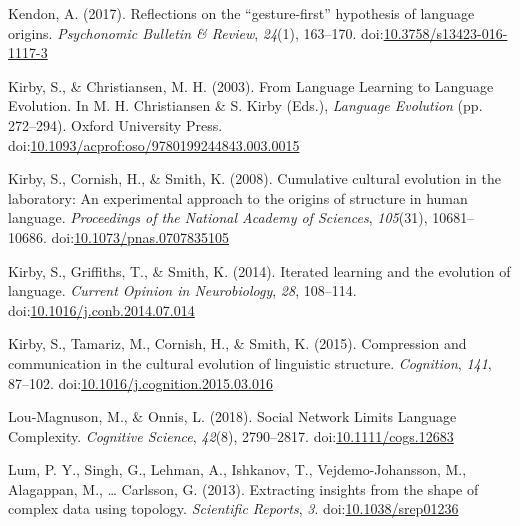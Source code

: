 \documentclass[
  man, noextraspace,floatsintext]{apa6}
\newlength{\cslhangindent}
\newenvironment{cslreferences}%
  {\setlength{\parindent}{0pt}%
  \everypar{\setlength{\hangindent}{\cslhangindent}}\ignorespaces}%
  {\par}
\begin{document}
\begin{cslreferences}
\leavevmode\hypertarget{ref-kendonReflectionsGesturefirstHypothesis2017}{}%
Kendon, A. (2017). Reflections on the ``gesture-first'' hypothesis of language origins. \emph{Psychonomic Bulletin \& Review}, \emph{24}(1), 163--170. doi:\href{https://doi.org/10.3758/s13423-016-1117-3}{10.3758/s13423-016-1117-3}

\leavevmode\hypertarget{ref-kirbyLanguageLearningLanguage2003}{}%
Kirby, S., \& Christiansen, M. H. (2003). From Language Learning to Language Evolution. In M. H. Christiansen \& S. Kirby (Eds.), \emph{Language Evolution} (pp. 272--294). Oxford University Press. doi:\href{https://doi.org/10.1093/acprof:oso/9780199244843.003.0015}{10.1093/acprof:oso/9780199244843.003.0015}

\leavevmode\hypertarget{ref-kirbyCumulativeCulturalEvolution2008}{}%
Kirby, S., Cornish, H., \& Smith, K. (2008). Cumulative cultural evolution in the laboratory: An experimental approach to the origins of structure in human language. \emph{Proceedings of the National Academy of Sciences}, \emph{105}(31), 10681--10686. doi:\href{https://doi.org/10.1073/pnas.0707835105}{10.1073/pnas.0707835105}

\leavevmode\hypertarget{ref-kirbyIteratedLearningEvolution2014}{}%
Kirby, S., Griffiths, T., \& Smith, K. (2014). Iterated learning and the evolution of language. \emph{Current Opinion in Neurobiology}, \emph{28}, 108--114. doi:\href{https://doi.org/10.1016/j.conb.2014.07.014}{10.1016/j.conb.2014.07.014}

\leavevmode\hypertarget{ref-kirbyCompressionCommunicationCultural2015a}{}%
Kirby, S., Tamariz, M., Cornish, H., \& Smith, K. (2015). Compression and communication in the cultural evolution of linguistic structure. \emph{Cognition}, \emph{141}, 87--102. doi:\href{https://doi.org/10.1016/j.cognition.2015.03.016}{10.1016/j.cognition.2015.03.016}

\leavevmode\hypertarget{ref-lou-magnusonSocialNetworkLimits2018}{}%
Lou‐Magnuson, M., \& Onnis, L. (2018). Social Network Limits Language Complexity. \emph{Cognitive Science}, \emph{42}(8), 2790--2817. doi:\href{https://doi.org/10.1111/cogs.12683}{10.1111/cogs.12683}

\leavevmode\hypertarget{ref-lumExtractingInsightsShape2013}{}%
Lum, P. Y., Singh, G., Lehman, A., Ishkanov, T., Vejdemo-Johansson, M., Alagappan, M., \ldots{} Carlsson, G. (2013). Extracting insights from the shape of complex data using topology. \emph{Scientific Reports}, \emph{3}. doi:\href{https://doi.org/10.1038/srep01236}{10.1038/srep01236}


\end{cslreferences}
\end{document}
